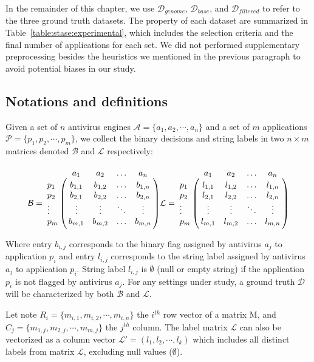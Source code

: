 In the remainder of this chapter, we use $\mathcal{D}_{genome}$, $\mathcal{D}_{base}$, and $\mathcal{D}_{filtered}$ to refer to the three ground truth datasets.
The property of each dataset are summarized in Table~\ref{table:stase:experimental}, which includes the selection criteria and the final number of applications for each set.
We did not performed supplementary preprocessing besides the heuristics we mentioned in the previous paragraph to avoid potential biases in our study.



\subsection{Notations and definitions}
Given a set of $n$ antivirus engines $\mathcal{A} = \{a_1, a_2, \cdots, a_n\}$ and a set of $m$ applications $\mathcal{P} = \{p_1, p_2, \cdots, p_m\}$, we collect the binary decisions and string labels in two $n \times m$ matrices denoted $\mathcal{B}$ and $\mathcal{L}$ respectively:

\[
	\mathcal{B} = \bordermatrix{ ~ & a_1 & a_2 & \ldots & a_n
		\cr p_1 & b_{1,1} & b_{1,2} & \ldots & b_{1,n}
		\cr p_2 & b_{2,1} & b_{2,2} & \ldots & b_{2,n}
		\cr \vdots & \vdots & \vdots & \ddots & \vdots
		\cr p_m & b_{m,1} & b_{m,2} & \ldots & b_{m,n} }
	\mathcal{L} = \bordermatrix{ ~ & a_1 & a_2 & \ldots & a_n
		\cr p_1 & l_{1,1} & l_{1,2} & \ldots & l_{1,n}
		\cr p_2 & l_{2,1} & l_{2,2} & \ldots & l_{2,n}
		\cr \vdots & \vdots & \vdots & \ddots & \vdots
		\cr p_m & l_{m,1} & l_{m,2} & \ldots & l_{m,n} }
\]

Where entry $b_{i,j}$ corresponds to the binary flag assigned by antivirus $a_j$ to application $p_i$ and entry $l_{i,j}$ corresponds to the string label assigned by antivirus $a_j$ to application $p_i $.
String label $l_{i,j}$ is $\emptyset$ (null or empty string) if the application $p_i$ is not flagged by antivirus $a_j$.
For any settings under study, a ground truth $\mathcal{D}$ will be characterized by both $\mathcal{B} $ and $\mathcal{L}$.

Let note $R_i = \{m_{i,1}, m_{i,2}, \cdots, m_{i,n}\}$ the $i^{th}$ row vector of a matrix M, and $C_j = \{m_{1,j}, m_{2,j}, \cdots, m_{m,j}\}$ the $j^{th}$ column.
The label matrix $\mathcal{L}$ can also be vectorized as a column vector $\mathcal{L'} = (l_1, l_2, \cdots, l_k)$ which includes all distinct labels from matrix $\mathcal{L}$, excluding null values ($\emptyset$).

